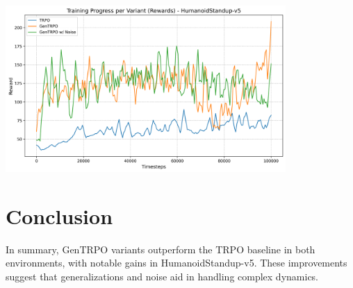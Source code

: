 \documentclass{svproc}
\begin{document}
\begin{center}
\includegraphics[width=0.8\textwidth]{graph_rewards_HumanoidStandup-v5.png}
\end{center}


\section{Conclusion}
In summary, GenTRPO variants outperform the TRPO baseline in both environments, with notable gains in HumanoidStandup-v5. These improvements suggest that generalizations and noise aid in handling complex dynamics.
\end{document}
